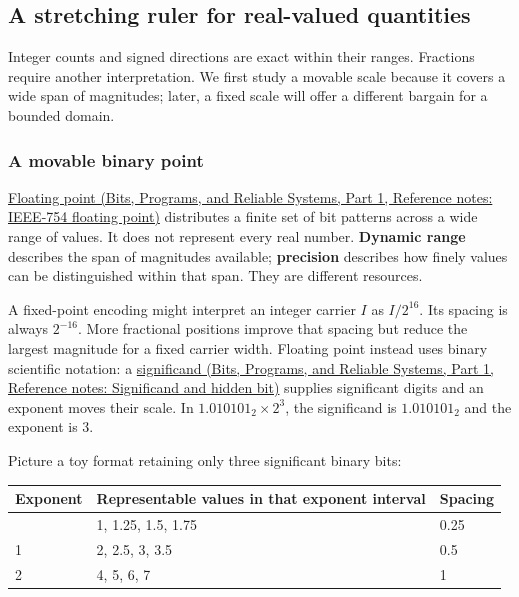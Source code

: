 \subsection{A stretching ruler for real-valued quantities}\label{05-engine-i-ch001-a-stretching-ruler-for-real-valued-quantities}

\hypertarget{05-engine-i-ch001-a-stretching-ruler-for-real-valued-quantities}{}

Integer counts and signed directions are exact within their ranges. Fractions require another interpretation. We first study a movable scale because it covers a wide span of magnitudes; later, a fixed scale will offer a different bargain for a bounded domain.

\subsubsection{A movable binary point}\label{05-engine-i-ch001-a-movable-binary-point}

\hypertarget{05-engine-i-ch001-a-movable-binary-point}{}

\href{../01-Bits-Programs-and-Reliable-Systems-P01/main.pdf\#appendix-343615f49ddf}{Floating point (Bits, Programs, and Reliable Systems, Part 1, Reference notes: IEEE-754 floating point)} distributes a finite set of bit patterns across a wide range of values. It does not represent every real number. \textbf{Dynamic range} describes the span of magnitudes available; \textbf{precision} describes how finely values can be distinguished within that span. They are different resources.

A fixed-point encoding might interpret an integer carrier \(I\) as \(I/2^{16}\). Its spacing is always \(2^{-16}\). More fractional positions improve that spacing but reduce the largest magnitude for a fixed carrier width. Floating point instead uses binary scientific notation: a \href{../01-Bits-Programs-and-Reliable-Systems-P01/main.pdf\#appendix-a24fd710cf67}{significand (Bits, Programs, and Reliable Systems, Part 1, Reference notes: Significand and hidden bit)} supplies significant digits and an exponent moves their scale. In \(1.010101_2\times2^3\), the significand is \(1.010101_2\) and the exponent is 3.

Picture a toy format retaining only three significant binary bits:

{\def\LTcaptype{none} %
\begin{longtable}[]{@{}lll@{}}
\toprule\noalign{}
Exponent & Representable values in that exponent interval & Spacing \\
\midrule\noalign{}
\endhead
\bottomrule\noalign{}
\endlastfoot
0 & 1, 1.25, 1.5, 1.75 & 0.25 \\
1 & 2, 2.5, 3, 3.5 & 0.5 \\
2 & 4, 5, 6, 7 & 1 \\
\end{longtable}
}

